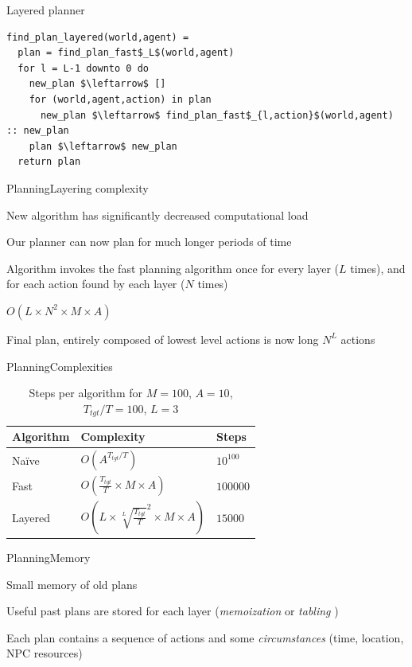 \documentclass{beamer}
\begin{document}
\begin{frame}[fragile]{Layered planner}
\begin{lstlisting}
find_plan_layered(world,agent) =
  plan = find_plan_fast$_L$(world,agent)
  for l = L-1 downto 0 do
    new_plan $\leftarrow$ []
    for (world,agent,action) in plan
      new_plan $\leftarrow$ find_plan_fast$_{l,action}$(world,agent) :: new_plan
    plan $\leftarrow$ new_plan
  return plan
\end{lstlisting}
\end{frame}

\begin{slide}{Planning}{Layering complexity}{
\item New algorithm has significantly decreased computational load 
\item Our planner can now plan for much longer periods of time
\item Algorithm invokes the fast planning algorithm once for every layer ($L$ times), and for each action found by each layer ($N$ times)
\item $O(L \times N^2 \times M \times A)$
\item Final plan, entirely composed of lowest level actions is now long $N^L$ actions
}\end{slide}

\begin{textslide}{Planning}{Complexities}{
\begin{table}
\center
\begin{tabular}{| l | p{3cm} | p{3cm} | }
\hline
Algorithm & Complexity & Steps \\
\hline
Naïve & $O(A^{T_{tgt} / T})$ & $10^{100}$ \\
Fast & $O(\frac{T_{tgt}}{T} \times M \times A)$ & $100000$ \\
Layered & $O(L \times \sqrt[L]{\frac{T_{tgt}}{T}}^2 \times M \times A)$ & $15000$ \\
\hline
\end{tabular}
\caption{Steps per algorithm for $M=100$, $A=10$, ${T_{tgt}/T}=100$, $L=3$}
\label{tab:steps}
\end{table}
}\end{textslide}

\begin{slide}{Planning}{Memory}{
\item Small memory of old plans
\item Useful past plans are stored for each layer \cite{MEMOIZATION_PLANNING} (\textit{memoization} or \textit{tabling} \cite{MEMOIZATION})
\item Each plan contains a sequence of actions and some \textit{circumstances} (time, location, NPC resources)
}\end{slide}
\end{document}
